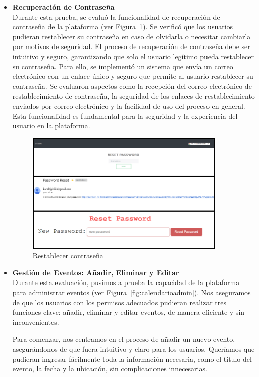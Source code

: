 \documentclass[a4paper, 12pt]{book}
\begin{document}
\begin{itemize}
  \item \textbf{Recuperación de Contraseña} \\
  Durante esta prueba, se evaluó la funcionalidad de recuperación de contraseña de la plataforma (ver Figura~\ref{fig:contrasenarest}). Se verificó que los usuarios 
  pudieran restablecer su contraseña en caso de olvidarla o necesitar cambiarla por motivos de seguridad. El proceso de recuperación de contraseña debe ser intuitivo 
  y seguro, garantizando que solo el usuario legítimo pueda restablecer su contraseña. Para ello, se implementó un sistema que envía un correo electrónico con un enlace 
  único y seguro que permite al usuario restablecer su contraseña. Se evaluaron aspectos como la recepción del correo electrónico de restablecimiento de contraseña, 
  la seguridad de los enlaces de restablecimiento enviados por correo electrónico y la facilidad de uso del proceso en general. Esta funcionalidad es fundamental 
  para la seguridad y la experiencia del usuario en la plataforma.
  \begin{figure}
    \centering
    \includegraphics[width=0.9\textwidth]{img/password.png}
    \caption{Restablecer contraseña}
    \label{fig:contrasenarest}
  \end{figure}

  \item \textbf{Gestión de Eventos: Añadir, Eliminar y Editar}\\
  Durante esta evaluación, pusimos a prueba la capacidad de la plataforma para administrar eventos (ver Figura~\ref{fig:calendarioadmin}). Nos aseguramos de que los 
  usuarios con los permisos adecuados pudieran realizar tres funciones clave: añadir, eliminar y editar eventos, de manera eficiente y sin inconvenientes. 

  Para comenzar, nos centramos en el proceso de añadir un nuevo evento, asegurándonos de que fuera intuitivo y claro para los usuarios. Queríamos que pudieran 
  ingresar fácilmente toda la información necesaria, como el título del evento, la fecha y la ubicación, sin complicaciones innecesarias.


\end{itemize}
\end{document}
